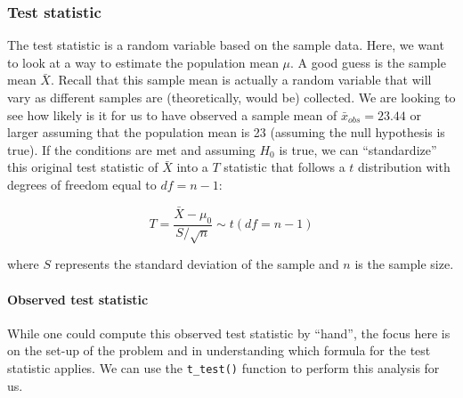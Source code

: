 \documentclass[12pt,]{krantz}
\makeatletter
\newenvironment{Shaded}{\begin{snugshade}}{\end{snugshade}}
\newcommand{\KeywordTok}[1]{\textcolor[rgb]{0.27,0.27,0.27}{\textbf{#1}}}
\newcommand{\DataTypeTok}[1]{\textcolor[rgb]{0.27,0.27,0.27}{#1}}
\newcommand{\DecValTok}[1]{\textcolor[rgb]{0.06,0.06,0.06}{#1}}
\newcommand{\StringTok}[1]{\textcolor[rgb]{0.5,0.5,0.5}{#1}}
\newcommand{\OtherTok}[1]{\textcolor[rgb]{0.37,0.37,0.37}{#1}}
\newcommand{\OperatorTok}[1]{\textcolor[rgb]{0.43,0.43,0.43}{\textbf{#1}}}
\newcommand{\NormalTok}[1]{#1}
\let\oldparagraph\paragraph
\renewcommand{\paragraph}[1]{\oldparagraph{#1}\mbox{}}
\newenvironment{kframe}{%
\medskip{}
\setlength{\fboxsep}{.8em}
 \def\at@end@of@kframe{}%
 \ifinner\ifhmode%
  \def\at@end@of@kframe{\end{minipage}}%
  \begin{minipage}{\columnwidth}%
 \fi\fi%
 \def\FrameCommand##1{\hskip\@totalleftmargin \hskip-\fboxsep
 \colorbox{shadecolor}{##1}\hskip-\fboxsep
     \hskip-\linewidth \hskip-\@totalleftmargin \hskip\columnwidth}%
 \MakeFramed {\advance\hsize-\width
   \@totalleftmargin\z@ \linewidth\hsize
   \@setminipage}}%
 {\par\unskip\endMakeFramed%
 \at@end@of@kframe}
\renewenvironment{Shaded}{\begin{kframe}}{\end{kframe}}
\theoremstyle{definition}
\theoremstyle{definition}
\theoremstyle{definition}
\theoremstyle{remark}
\makeatother
\begin{document}
\subsubsection*{Test statistic}\label{test-statistic}


The test statistic is a random variable based on the sample data. Here,
we want to look at a way to estimate the population mean \(\mu\). A good
guess is the sample mean \(\bar{X}\). Recall that this sample mean is
actually a random variable that will vary as different samples are
(theoretically, would be) collected. We are looking to see how likely is
it for us to have observed a sample mean of \(\bar{x}_{obs} = 23.44\) or
larger assuming that the population mean is 23 (assuming the null
hypothesis is true). If the conditions are met and assuming \(H_0\) is
true, we can ``standardize'' this original test statistic of \(\bar{X}\)
into a \(T\) statistic that follows a \(t\) distribution with degrees of
freedom equal to \(df = n - 1\):

\[ T =\dfrac{ \bar{X} - \mu_0}{ S / \sqrt{n} } \sim t (df = n - 1) \]

where \(S\) represents the standard deviation of the sample and \(n\) is
the sample size.

\paragraph{Observed test statistic}\label{observed-test-statistic}

While one could compute this observed test statistic by ``hand'', the
focus here is on the set-up of the problem and in understanding which
formula for the test statistic applies. We can use the
\texttt{t\_test()} function to perform this analysis for us.

\begin{Shaded}
\end{Shaded}
\end{document}
